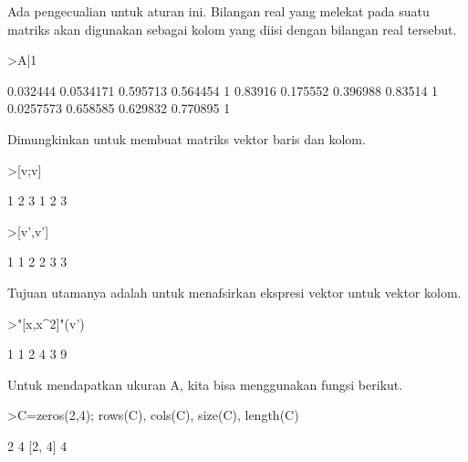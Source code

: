 \documentclass[a4paper,10pt]{article}
\begin{document}
\begin{eulernotebook}
\begin{eulercomment}
\begin{eulercomment}
\begin{eulercomment}
\begin{eulercomment}
\begin{eulercomment}
\begin{eulercomment}
\begin{eulercomment}
\begin{eulercomment}
\begin{eulercomment}
Ada pengecualian untuk aturan ini. Bilangan real yang melekat pada
suatu matriks akan digunakan sebagai kolom yang diisi dengan bilangan
real tersebut.
\end{eulercomment}
\begin{eulerprompt}
>A|1
\end{eulerprompt}
\begin{euleroutput}
       0.032444     0.0534171      0.595713      0.564454             1 
        0.83916      0.175552      0.396988       0.83514             1 
      0.0257573      0.658585      0.629832      0.770895             1 
\end{euleroutput}
\begin{eulercomment}
Dimungkinkan untuk membuat matriks vektor baris dan kolom.
\end{eulercomment}
\begin{eulerprompt}
>[v;v]
\end{eulerprompt}
\begin{euleroutput}
              1             2             3 
              1             2             3 
\end{euleroutput}
\begin{eulerprompt}
>[v',v']
\end{eulerprompt}
\begin{euleroutput}
              1             1 
              2             2 
              3             3 
\end{euleroutput}
\begin{eulercomment}
Tujuan utamanya adalah untuk menafsirkan ekspresi vektor untuk vektor
kolom.
\end{eulercomment}
\begin{eulerprompt}
>"[x,x^2]"(v')
\end{eulerprompt}
\begin{euleroutput}
              1             1 
              2             4 
              3             9 
\end{euleroutput}
\begin{eulercomment}
Untuk mendapatkan ukuran A, kita bisa menggunakan fungsi berikut.
\end{eulercomment}
\begin{eulerprompt}
>C=zeros(2,4); rows(C), cols(C), size(C), length(C)
\end{eulerprompt}
\begin{euleroutput}
  2
  4
  [2,  4]
  4
\end{euleroutput}
\begin{eulercomment}

\end{eulercomment}
\end{eulercomment}
\end{eulercomment}
\end{eulercomment}
\end{eulercomment}
\end{eulercomment}
\end{eulercomment}
\end{eulercomment}
\end{eulercomment}
\end{eulernotebook}
\end{document}
